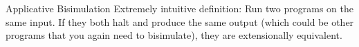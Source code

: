 \documentclass{beamer}
\begin{document}


\begin{frame}{Applicative Bisimulation}
Extremely intuitive definition: Run two programs on the same input. If
they both halt and produce the same output (which could be other
programs that you again need to bisimulate), they are extensionally
equivalent.
\end{frame}
\end{document}
